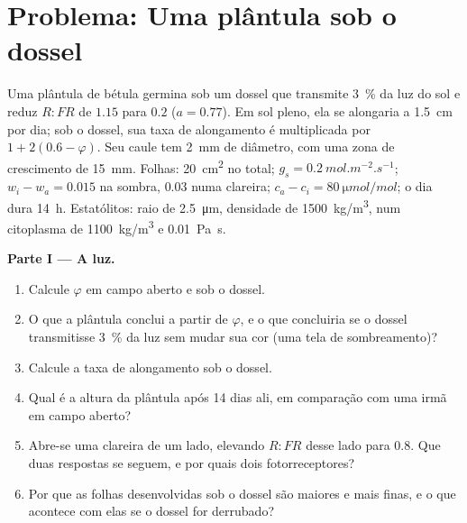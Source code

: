 \section{Problema: Uma plântula sob o dossel}

\begin{problem}
\label{pb:b2:plant-plasticity:1}
Uma plântula de bétula germina sob um dossel que transmite \qty{3}{\%}
da luz do sol e reduz $R{:}FR$ de $1.15$ para $0.2$ ($a = 0.77$). Em
sol pleno, ela se alongaria a \qty{1.5}{cm} por dia; sob o dossel, sua
taxa de alongamento é multiplicada por $1 +
2(0.6 - \varphi)$. Seu caule tem \qty{2}{mm} de diâmetro, com uma zona
de crescimento de \qty{15}{mm}. Folhas: \qty{20}{cm^2} no total;
$g_s =
\qty{0.2}{mol.m^{-2}.s^{-1}}$; $w_i - w_a = 0.015$ na sombra, $0.03$
numa clareira; $c_a - c_i = \qty{80}{\micro mol/mol}$; o dia dura
\qty{14}{h}. Estatólitos: raio de \qty{2.5}{\micro m}, densidade de
\qty{1500}{kg/m^3}, num citoplasma de \qty{1100}{kg/m^3} e
\qty{0.01}{Pa.s}.

\medskip
\noindent\textbf{Parte I --- A luz.}
\begin{enumerate}
  \item Calcule $\varphi$ em campo aberto e sob o dossel.
  \item O que a plântula conclui a partir de $\varphi$, e o que
        concluiria se o dossel transmitisse \qty{3}{\%} da luz sem mudar
        sua cor (uma tela de sombreamento)?
  \item Calcule a taxa de alongamento sob o dossel.
  \item Qual é a altura da plântula após 14 dias ali, em comparação com
        uma irmã em campo aberto?
  \item Abre-se uma clareira de um lado, elevando $R{:}FR$ desse lado
        para $0.8$. Que duas respostas se seguem, e por quais dois
        fotorreceptores?
  \item Por que as folhas desenvolvidas sob o dossel são maiores e mais
        finas, e o que acontece com elas se o dossel for derrubado?
\end{enumerate}


\end{problem}
